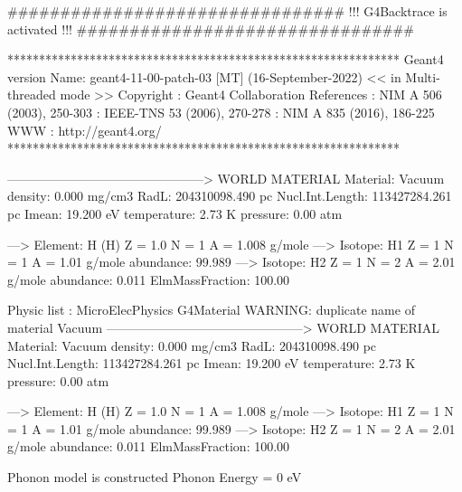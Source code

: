 

          ################################
          !!! G4Backtrace is activated !!!
          ################################


**************************************************************
 Geant4 version Name: geant4-11-00-patch-03 [MT]   (16-September-2022)
  << in Multi-threaded mode >> 
                       Copyright : Geant4 Collaboration
                      References : NIM A 506 (2003), 250-303
                                 : IEEE-TNS 53 (2006), 270-278
                                 : NIM A 835 (2016), 186-225
                             WWW : http://geant4.org/
**************************************************************

 -----------------------------------------------> WORLD MATERIAL  Material:   Vacuum    density:  0.000 mg/cm3  RadL: 204310098.490 pc   Nucl.Int.Length: 113427284.261 pc 
                       Imean:  19.200 eV   temperature:   2.73 K  pressure:   0.00 atm

   --->  Element: H (H)   Z =  1.0   N =     1   A =  1.008 g/mole
         --->  Isotope:    H1   Z =  1   N =   1   A =   1.01 g/mole   abundance: 99.989 %
         --->  Isotope:    H2   Z =  1   N =   2   A =   2.01 g/mole   abundance:  0.011 %
          ElmMassFraction: 100.00 %

Physic list : MicroElecPhysics
G4Material WARNING: duplicate name of material Vacuum
 -----------------------------------------------> WORLD MATERIAL  Material:   Vacuum    density:  0.000 mg/cm3  RadL: 204310098.490 pc   Nucl.Int.Length: 113427284.261 pc 
                       Imean:  19.200 eV   temperature:   2.73 K  pressure:   0.00 atm

   --->  Element: H (H)   Z =  1.0   N =     1   A =  1.008 g/mole
         --->  Isotope:    H1   Z =  1   N =   1   A =   1.01 g/mole   abundance: 99.989 %
         --->  Isotope:    H2   Z =  1   N =   2   A =   2.01 g/mole   abundance:  0.011 %
          ElmMassFraction: 100.00 %

Phonon model is constructed 
Phonon Energy = 0 eV  


